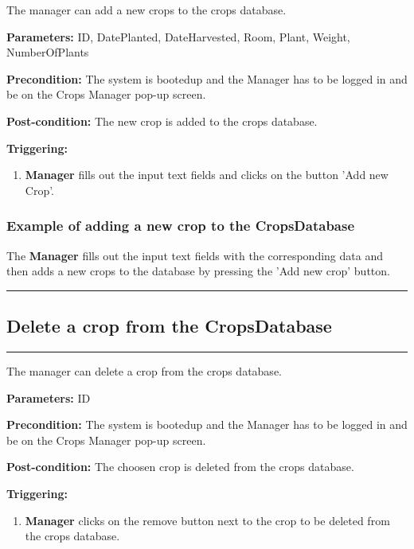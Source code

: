 The manager can add a new crops to the crops database.

\begin{description}

\item \textbf{Parameters:} ID, DatePlanted, DateHarvested, Room, Plant, Weight, NumberOfPlants
\item \textbf{Precondition:} The system is bootedup and the Manager has to be
logged in and be on the Crops Manager pop-up screen.
\item \textbf{Post-condition:} The new crop is added to the crops database.
\item \textbf{Triggering:}
\begin{enumerate}

\item \textbf{Manager} fills out the input text fields and clicks on the button 'Add new Crop'.

\end{enumerate}
\end{description}

\subsubsection{Example of adding a new crop to the CropsDatabase}
The \textbf{Manager} fills out the input text fields with the corresponding data and then adds a new crops to the database by pressing the 'Add new crop' button.
\hfill
\vspace{0.5cm}
\hrule


\break

\subsection{Delete a crop from the CropsDatabase}
\hrule
\hfill
\vspace{0.5cm}
\label{operation:Delete a crop from the CropsDatabase}

The manager can delete a crop from the crops database.

\begin{description}

\item \textbf{Parameters:} ID
\item \textbf{Precondition:} The system is bootedup and the Manager has to be
logged in and be on the Crops Manager pop-up screen.
\item \textbf{Post-condition:} The choosen crop is deleted from the crops database.
\item \textbf{Triggering:}
\begin{enumerate}

\item \textbf{Manager} clicks on the remove button next to the crop to be deleted from the crops database.

\end{enumerate}
\end{description}

